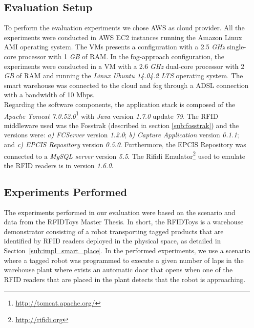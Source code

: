 \subsection{Evaluation Setup}
\label{sub:eval_setup}
To perform the evaluation experiments we chose \gls{AWS} as cloud provider. All the experiments were
conducted in \gls{AWS} \gls{EC2} instances running the Amazon Linux \gls{AMI} operating system. The \glspl{VM}
presents a configuration with a 2.5 \textit{\gls{GHz}} single-core processor with 1 \textit{\gls{GB}} of
\gls{RAM}. In the fog-approach configuration, the experiments were conducted in a \gls{VM} with
a 2.6 \textit{\gls{GHz}} dual-core processor with 2 \textit{\gls{GB}} of \gls{RAM} and running
the \textit{Linux Ubuntu 14.04.2 LTS} operating system. The smart warehouse was connected to the cloud
and fog through a \gls{ADSL} connection with a bandwidth of 10 Mbps.\\

Regarding the software components, the application stack is composed of the \textit{Apache Tomcat 7.0.52.0}\footnote{\url{http://tomcat.apache.org/}}
with \textit{Java} version \textit{1.7.0} update \textit{79}. The \gls{RFID} middleware used was the Fosstrak
(described in section \ref{sub:fosstrak}) and the versions were: \textit{a) \gls{FCServer}} version
\textit{1.2.0}; \textit{b) Capture Application} version \textit{0.1.1}; and \textit{c) \gls{EPCIS} Repository}
version \textit{0.5.0}. Furthermore, the \gls{EPCIS} Repository was connected to a \textit{MySQL server}
version \textit{5.5}. The Rifidi Emulator\footnote{\url{http://rifidi.org}} used to emulate the \gls{RFID}
readers is in version \textit{1.6.0}.

\subsection{Experiments Performed}
\label{sub:eval_experiments}
The experiments performed in our evaluation were based on the scenario and data from the RFIDToys \cite{Correia:Thesis:2014}
Master Thesis. In short, the RFIDToys is a warehouse demonstrator consisting of a robot transporting
tagged products that are identified by RFID readers deployed in the physical space, as detailed in
Section~\ref{sub:impl_smart_place}. In the performed experiments, we use a scenario where a tagged
robot was programmed to execute  a given number of laps in the warehouse plant where exists an automatic
door that opens when one of the RFID readers that are placed in the plant detects that the robot is
approaching.\\

